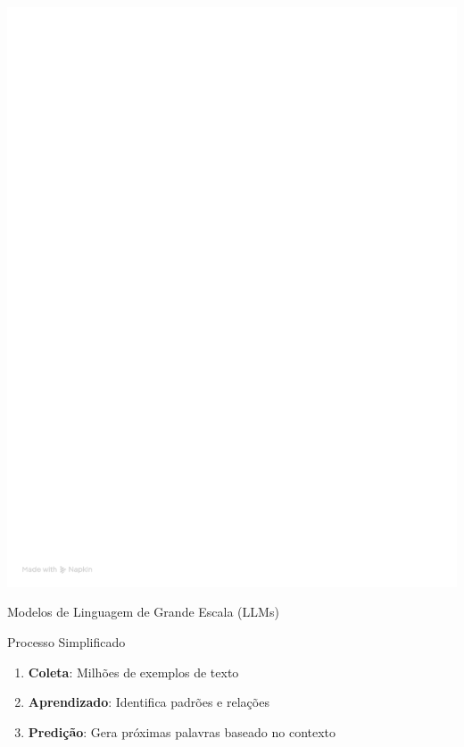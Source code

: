 \documentclass[aspectratio=169,12pt]{beamer}
\begin{document}
\begin{frame}
 \begin{center}
    \includegraphics[scale=0.22]{esquema-ia.png}    
 \end{center}
\end{frame}
    
    \begin{frame}{Modelos de Linguagem de Grande Escala (LLMs)}
    \begin{block}{Processo Simplificado}
        \begin{enumerate}
            \item \textbf{Coleta}: Milhões de exemplos de texto
            \item \textbf{Aprendizado}: Identifica padrões e relações
            \item \textbf{Predição}: Gera próximas palavras baseado no contexto
        \end{enumerate}
    \end{block}
\end{frame}
\end{document}
